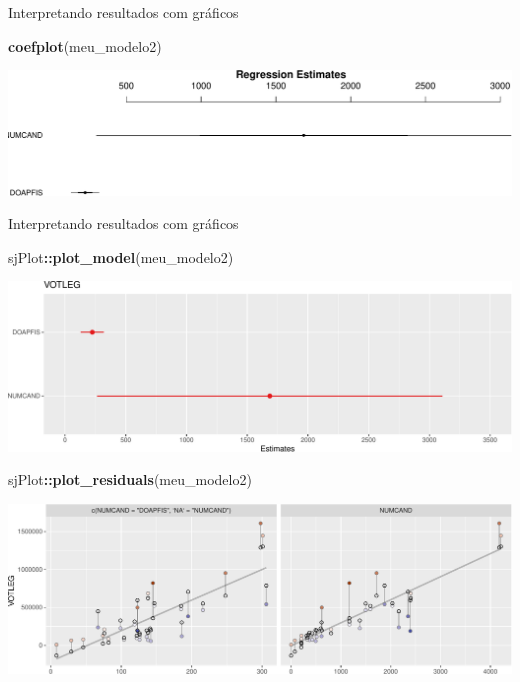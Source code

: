 \documentclass[
  9pt,
  ignorenonframetext,
  aspectratio=169]{beamer}
\newenvironment{Shaded}{\begin{snugshade}}{\end{snugshade}}
\newcommand{\KeywordTok}[1]{\textcolor[rgb]{0.13,0.29,0.53}{\textbf{#1}}}
\newcommand{\NormalTok}[1]{#1}
\newcommand{\OperatorTok}[1]{\textcolor[rgb]{0.81,0.36,0.00}{\textbf{#1}}}
\begin{document}
\begin{frame}[fragile]{Interpretando resultados com gráficos}
\protect\hypertarget{interpretando-resultados-com-gruxe1ficos}{}
\begin{Shaded}
\begin{Highlighting}[]
\KeywordTok{coefplot}\NormalTok{(meu\_modelo2)}
\end{Highlighting}
\end{Shaded}

\includegraphics{aula_12_files/figure-beamer/unnamed-chunk-26-1.pdf}
\end{frame}

\begin{frame}[fragile]{Interpretando resultados com gráficos}
\protect\hypertarget{interpretando-resultados-com-gruxe1ficos-1}{}
\begin{Shaded}
\begin{Highlighting}[]
\NormalTok{sjPlot}\OperatorTok{::}\KeywordTok{plot\_model}\NormalTok{(meu\_modelo2)}
\end{Highlighting}
\end{Shaded}

\includegraphics{aula_12_files/figure-beamer/unnamed-chunk-27-1.pdf}
\end{frame}

\begin{frame}[fragile]{}
\protect\hypertarget{section-10}{}
\begin{Shaded}
\begin{Highlighting}[]
\NormalTok{sjPlot}\OperatorTok{::}\KeywordTok{plot\_residuals}\NormalTok{(meu\_modelo2)}
\end{Highlighting}
\end{Shaded}

\includegraphics{aula_12_files/figure-beamer/unnamed-chunk-28-1.pdf}
\end{frame}
\end{document}

